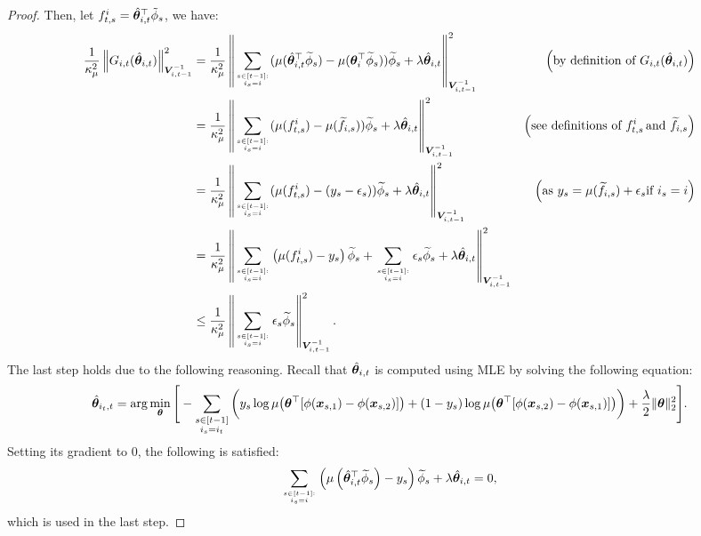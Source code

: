 \begin{proof}
Then, let $f^i_{t,s}=\hat{\boldsymbol{\theta}}_{i,t}^\top\tilde\phi_s$, we have:
\begin{align*}
\frac{1}{\kappa_\mu^2} \left\| G_{i,t}(\hat{\boldsymbol{\theta}}_{i,t}) \right\|_{\boldsymbol{V}_{i,t-1}^{-1}}^2 &= \frac{1}{\kappa_\mu^2} \left\| \sum_{s\in[t-1]:\atop i_s=i} (\mu(\hat{\boldsymbol{\theta}}_{i,t}^\top \widetilde{\phi}_s ) - \mu(\boldsymbol{\theta}_i^\top \widetilde{\phi}_s) ) \widetilde{\phi}_s + \lambda \hat{\boldsymbol{\theta}}_{i,t} \right\|_{\boldsymbol{V}_{i,t-1}^{-1}}^2 & \left(\text{by definition of } G_{i,t}(\hat{\boldsymbol{\theta}}_{i,t}) \right) \\
    &= \frac{1}{\kappa_\mu^2} \left\| \sum_{s\in[t-1]:\atop i_s=i} (\mu(f^i_{t,s}) - \mu(\widetilde{f}_{i,s}) ) \widetilde{\phi}_s + \lambda \hat{\boldsymbol{\theta}}_{i,t} \right\|_{\boldsymbol{V}_{i,t-1}^{-1}}^2 & \left(\text{see definitions of } f^i_{t,s}\, \text{and } \widetilde{f}_{i,s} \right) \\
    &= \frac{1}{\kappa_\mu^2} \left\| \sum_{s\in[t-1]:\atop i_s=i} (\mu(f^i_{t,s}) - (y_s - \epsilon_s) ) \widetilde{\phi}_s + \lambda \hat{\boldsymbol{\theta}}_{i,t} \right\|_{\boldsymbol{V}_{i,t-1}^{-1}}^2 & \left(\text{as } y_s = \mu(\widetilde{f}_{i,s}) + \epsilon_s \text{if } i_s=i \right) \\
    &= \frac{1}{\kappa_\mu^2} \left\| \sum_{s\in[t-1]:\atop i_s=i} \left(\mu(f^i_{t,s}) - y_s\right) \widetilde{\phi}_s + \sum_{s\in[t-1]:\atop i_s=i}\epsilon_s \widetilde{\phi}_s  + \lambda \hat{\boldsymbol{\theta}}_{i,t} \right\|_{\boldsymbol{V}_{i,t-1}^{-1}}^2 \\
    &\leq \frac{1}{\kappa_\mu^2} \left\| \sum_{s\in[t-1]:\atop i_s=i}\epsilon_s \widetilde{\phi}_s \right\|_{\boldsymbol{V}_{i,t-1}^{-1}}^2.
\end{align*}
The last step holds due to the following reasoning. Recall that $\hat{\boldsymbol{\theta}}_{i,t}$ is computed using MLE by solving the following equation:
    \begin{equation}
         \hat{\boldsymbol{\theta}}_{i_t,t} = \arg\min_{\boldsymbol{\theta}} \Bigg[ - \sum_{\substack{s \in [t-1] \\ i_s = i_t}} \bigg( y_s \log \mu\big(\boldsymbol{\theta}^\top [\phi(\boldsymbol{x}_{s,1}) - \phi(\boldsymbol{x}_{s,2})]\big)
        + (1 - y_s) \log \mu\big(\boldsymbol{\theta}^\top [\phi(\boldsymbol{x}_{s,2}) - \phi(\boldsymbol{x}_{s,1})]\big) \bigg) + \frac{\lambda}{2} \|\boldsymbol{\theta}\|_2^2 \Bigg].
    \end{equation}
Setting its gradient to $0$, the following is satisfied:
\begin{equation}
    \sum_{s\in[t-1]:\atop i_s=i} \left(\mu\left( \hat{\boldsymbol{\theta}}_{i,t}^{\top} \widetilde{\phi}_s \right) - y_s\right) \widetilde{\phi}_s + \lambda \hat{\boldsymbol{\theta}}_{i,t} = 0,
\end{equation}
which is used in the last step.


\end{proof}
